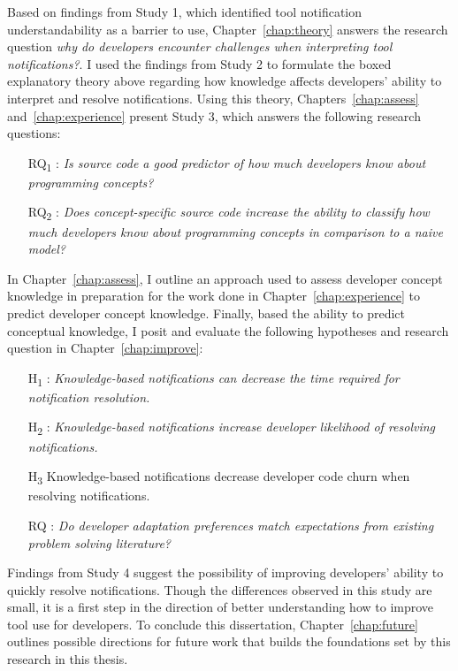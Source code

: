 Based on findings from Study 1, which identified tool notification understandability as a barrier to use, Chapter~\ref{chap:theory} answers the research question \textit{why do developers encounter challenges when interpreting tool notifications?}.
I used the findings from Study 2 to formulate the boxed explanatory theory above regarding how knowledge affects developers' ability to interpret and resolve notifications.
Using this theory, Chapters~\ref{chap:assess} and~\ref{chap:experience} present Study 3, which answers the following research questions:
\begin{itemize}
    \item [RQ\textsubscript{1}]: \textit{Is source code a good predictor of how much developers know about programming concepts?}
	\item [RQ\textsubscript{2}]: \textit{Does concept-specific source code increase the ability to classify how much developers know about programming concepts in comparison to a naive model?}
\end{itemize}

In Chapter~\ref{chap:assess}, I outline an approach used to assess developer concept knowledge in preparation for the work done in Chapter~\ref{chap:experience} to predict developer concept knowledge.
Finally, based the ability to predict conceptual knowledge, I posit and evaluate the following hypotheses and research question in Chapter~\ref{chap:improve}:
\begin{itemize}
    \item [H\textsubscript{1}]: \textit{Knowledge-based notifications can decrease the time required for notification resolution.}
    \item [H\textsubscript{2}]: \textit{Knowledge-based notifications increase developer likelihood of resolving notifications. }
    \item [H\textsubscript{3}] Knowledge-based notifications decrease developer code churn when resolving notifications.
    \item[RQ]: \textit{Do developer adaptation preferences match expectations from existing problem solving literature?}
\end{itemize}

Findings from Study 4 suggest the possibility of improving developers' ability to quickly resolve notifications. Though the differences observed in this study are small, it is a first step in the direction of better understanding how to improve tool use for developers. To conclude this dissertation, Chapter~\ref{chap:future} outlines possible directions for future work that builds the foundations set by this research in this thesis.

